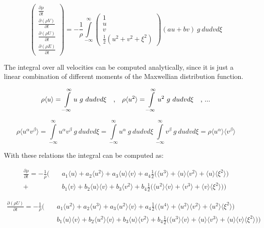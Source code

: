 \documentclass[
	pdftex,             %
	12pt,				%
	a4paper,		   	%
	english,				%
	oneside,			%
]{article}
\newcommand{\mom}[1]{\langle #1 \rangle}
\begin{document}
\begin{equation}
\begin{pmatrix}
	\frac{\partial \rho    }{\partial t} \\
	\frac{\partial (\rho V)}{\partial t} \\
	\frac{\partial (\rho U)}{\partial t} \\
	\frac{\partial (\rho E)}{\partial t}
\end{pmatrix}
 =
 -\frac{1}{\rho}
\int \limits^{\infty}_{-\infty}
\begin{pmatrix}
	1 \\
	u \\
	v \\
	\frac{1}{2} ( u^2 + v^2 + \xi^2 )
\end{pmatrix}
(a u + b v) ~g~
du dv d\xi
\end{equation}

The integral over all velocities can be computed analytically, since it is just a linear combination of different moments of the Maxwellian distribution function.

\begin{equation}
\rho \mom{u} = \int \limits^{\infty}_{-\infty} u ~g~ du dv d\xi
~~~\textnormal{,} ~~~
\rho \mom{u^2} = \int \limits^{\infty}_{-\infty} u^2 ~g~ du dv d\xi
~~~\textnormal{, ...}
\end{equation}

\begin{equation}
\rho \mom{u^\alpha v^\beta}
= 
\int \limits^{\infty}_{-\infty} u^\alpha v^\beta ~g~ du dv d\xi
=
\int \limits^{\infty}_{-\infty} u^\alpha ~g~ du dv d\xi ~ 
\int \limits^{\infty}_{-\infty} v^\beta  ~g~ du dv d\xi
=
\rho \mom{u^\alpha}\mom{v^\beta}
\end{equation}

With these relations the integral can be computed as:

\begin{eqnarray*}
\frac{\partial \rho}{\partial t}
=
-\frac{1}{\rho}
\Bigg(
 &~&a_1 \mom{u} + a_2 \mom{u^2} + a_3 \mom{u}\mom{v}
+   a_4 \frac{1}{2} \Big( \mom{u^3} + \mom{u}\mom{v^2} + \mom{u}\mom{\xi^2} \Big)
\\
+&~&b_1 \mom{v} + b_2 \mom{u}\mom{v} + b_3 \mom{v^2}
+   b_4  \frac{1}{2} \Big( \mom{u^2}\mom{v} + \mom{v^3} + \mom{v}\mom{\xi^2} \Big)
\Bigg)
\end{eqnarray*}

\begin{eqnarray*}
\frac{\partial (\rho U)}{\partial t}
=
-\frac{1}{\rho}
\Bigg(
&~&a_1 \mom{u^2} + a_2 \mom{u^3} + a_3 \mom{u^2}\mom{v}
+  a_4 \frac{1}{2} \Big( \mom{u^4} + \mom{u^2}\mom{v^2} + \mom{u^2}\mom{\xi^2} \Big)
\\
&~&b_1 \mom{u}\mom{v} + b_2 \mom{u^2}\mom{v} + b_3 \mom{u}\mom{v^2}
+  b_4 \frac{1}{2} \Big( \mom{u^3}\mom{v} + \mom{u}\mom{v^3} + \mom{u}\mom{v}\mom{\xi^2} \Big)
\Bigg)
\end{eqnarray*}
\end{document}
